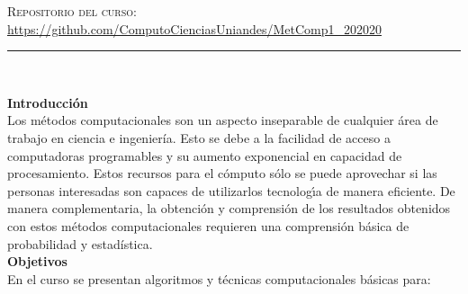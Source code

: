 \documentclass[letterpaper,10pt,onecolumn]{article}
\begin{document}
\noindent\textsc{Repositorio del curso:} \url{https://github.com/ComputoCienciasUniandes/MetComp1_202020}






\noindent\rule{\textwidth}{1pt}\\[-0.1cm]

\addtocounter{mysection}{1}

\noindent\textbf{\large {} \quad Introducci\'on}\\[-0.2cm]


\noindent\normalsize Los m\'etodos computacionales son un aspecto
inseparable de cualquier \'area de trabajo en ciencia e ingenier\'ia.
Esto se debe a la facilidad de acceso a computadoras programables  y
su aumento exponencial en capacidad de procesamiento.  
Estos recursos para el c\'omputo s\'olo se puede aprovechar si las
personas interesadas son capaces de utilizarlos tecnolog\'{\i}a
de manera eficiente.
De manera complementaria, la obtenci\'on y comprensi\'on de los
resultados obtenidos  con estos m\'etodos computacionales requieren
una comprensi\'on b\'asica de probabilidad y estad\'istica. \\[0.1cm]  

\noindent\textbf{\large {} \quad Objetivos}\\[-0.2cm]

\noindent\normalsize En el curso se presentan
algoritmos y t\'ecnicas computacionales b\'asicas para:
\end{document}
